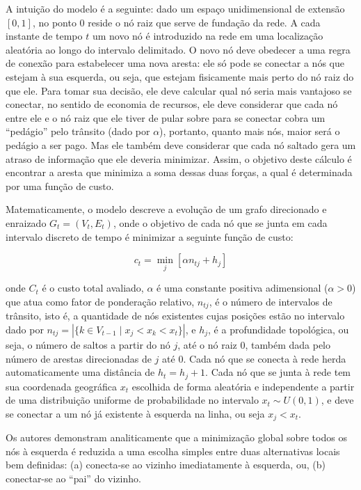\documentclass[12pt,oneside,a4paper,brazil,sumario=tradicional]{abntex2}
\begin{document}
A intuição do modelo é a seguinte: dado um espaço unidimensional de extensão $[0,1]$, no ponto 0 reside o nó raiz que serve de fundação da rede. A cada instante de tempo $t$ um novo nó é introduzido na rede em uma localização aleatória ao longo do intervalo delimitado. O novo nó deve obedecer a uma regra de conexão para estabelecer uma nova aresta: ele só pode se conectar a nós que estejam à sua esquerda, ou seja, que estejam fisicamente mais perto do nó raiz do que ele. Para tomar sua decisão, ele deve calcular qual nó seria mais vantajoso se conectar, no sentido de economia de recursos, ele deve considerar que cada nó entre ele e o nó raiz que ele tiver de pular sobre para se conectar cobra um “pedágio” pelo trânsito (dado por $\alpha$), portanto, quanto mais nós, maior será o pedágio a ser pago. Mas ele também deve considerar que cada nó saltado gera um atraso de informação que ele deveria minimizar. Assim, o objetivo deste cálculo é encontrar a aresta que minimiza a soma dessas duas forças, a qual é determinada por uma função de custo.

Matematicamente, o modelo descreve a evolução de um grafo direcionado e enraizado $G_{t} = (V_{t}, E_{t})$, onde o objetivo de cada nó que se junta em cada intervalo discreto de tempo é minimizar a seguinte função de custo:

\[c_{t} = \min_{j}[\alpha n_{tj} + h_{j}]\]

onde $C_{t}$ é o custo total avaliado, $\alpha$ é uma constante positiva adimensional ($\alpha > 0$) que atua como fator de ponderação relativo, $n_{tj}$, é o número de intervalos de trânsito, isto é, a quantidade de nós existentes cujas posições estão no intervalo dado por $n_{tj} = |\lbrace k \in V_{t-1} \mid x_{j} < x_{k} < x_{t}\rbrace|$, e $h_{j}$, é a profundidade topológica, ou seja, o número de saltos a partir do nó $j$, até o nó raiz $0$, também dada pelo número de arestas direcionadas de $j$ até $0$. Cada nó que se conecta à rede herda automaticamente uma distância de $h_{t} = h_{j}+1$. Cada nó que se junta à rede tem sua coordenada geográfica $x_{t}$ escolhida de forma aleatória e independente a partir de uma distribuição uniforme de probabilidade no intervalo $x_{t} \sim U(0,1)$, e deve se conectar a um nó já existente à esquerda na linha, ou seja $x_{j} < x_{t}$.

Os autores demonstram analiticamente que a minimização global sobre todos os nós à esquerda é reduzida a uma escolha simples entre duas alternativas locais bem definidas: (a) conecta-se ao vizinho imediatamente à esquerda, ou, (b) conectar-se ao “pai” do vizinho.
\end{document}
